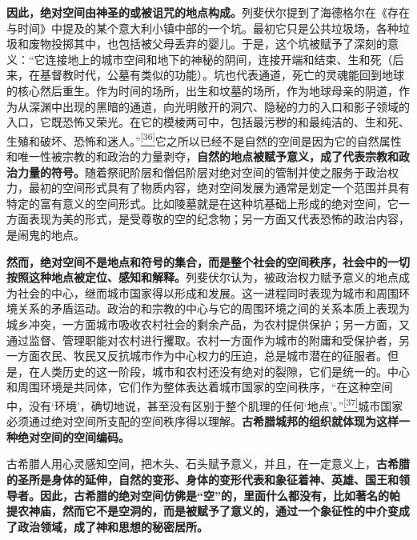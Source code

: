 \documentclass[UTF8, fontset = sourcesans, a4paper, oneside, zihao =
-4, scheme=chinese, no-math, space=true]{ctexbook}
\begin{document}
\textbf{因此，绝对空间由神圣的或被诅咒的地点构成。}列斐伏尔提到了海德格尔在《存在与时间》中提及的某个意大利小镇中部的一个坑。最初它只是公共垃圾场，各种垃圾和废物投掷其中，也包括被父母丢弃的婴儿。于是，这个坑被赋予了深刻的意义：``它连接地上的城市空间和地下的神秘的阴间，连接开端和结束、生和死（后来，在基督教时代，公墓有类似的功能）。坑也代表通道，死亡的灵魂能回到地球的核心然后重生。作为时间的场所，出生和坟墓的场所，作为地球母亲的阴道，作为从深渊中出现的黑暗的通道，向光明敞开的洞穴、隐秘的力的入口和影子领域的入口，它既恐怖又荣光。在它的模棱两可中，包括最污秽的和最纯洁的、生和死、生殖和破坏、恐怖和迷人。''\protect\hypertarget{part0006_split_003.htmlux5cux23w36}{}{}\protect\hyperlink{part0006_split_003.htmlux5cux23m36}{\textsuperscript{{[}36{]}}}它之所以已经不是自然的空间是因为它的自然属性和唯一性被宗教的和政治的力量剥夺，\textbf{自然的地点被赋予意义，成了代表宗教和政治力量的符号。}随着祭祀阶层和僧侣阶层对绝对空间的管制并使之服务于政治权力，最初的空间形式具有了物质内容，绝对空间发展为通常是划定一个范围并具有特定的富有意义的空间形式。比如陵墓就是在这种坑基础上形成的绝对空间，它一方面表现为美的形式，是受尊敬的空的纪念物；另一方面又代表恐怖的政治内容，是闹鬼的地点。

\textbf{然而，绝对空间不是地点和符号的集合，而是整个社会的空间秩序，社会中的一切按照这种地点被定位、感知和解释。}列斐伏尔认为，被政治权力赋予意义的地点成为社会的中心，继而城市国家得以形成和发展。这一进程同时表现为城市和周围环境关系的矛盾运动。政治的和宗教的中心与它的周围环境之间的关系本质上表现为城乡冲突，一方面城市吸收农村社会的剩余产品，为农村提供保护；另一方面，又通过监督、管理职能对农村进行攫取。农村一方面作为城市的附庸和受保护者，另一方面农民、牧民又反抗城市作为中心权力的压迫，总是城市潜在的征服者。但是，在人类历史的这一阶段，城市和农村还没有绝对的裂隙，它们是统一的。中心和周围环境是共同体，它们作为整体表达着城市国家的空间秩序，``在这种空间中，没有`环境'，确切地说，甚至没有区别于整个肌理的任何`地点'。''\protect\hypertarget{part0006_split_003.htmlux5cux23w37}{}{}\protect\hyperlink{part0006_split_003.htmlux5cux23m37}{\textsuperscript{{[}37{]}}}城市国家必须通过绝对空间所支配的空间秩序得以理解。\textbf{古希腊城邦的组织就体现为这样一种绝对空间的空间编码。}

古希腊人用心灵感知空间，把木头、石头赋予意义，并且，在一定意义上，\textbf{古希腊的圣所是身体的延伸，自然的变形、身体的变形代表和象征着神、英雄、国王和领导者。因此，古希腊的绝对空间仿佛是``空''的，里面什么都没有，比如著名的帕提农神庙，然而它不是空洞的，而是被赋予了意义的，通过一个象征性的中介变成了政治领域，成了神和思想的秘密居所。}
\end{document}

